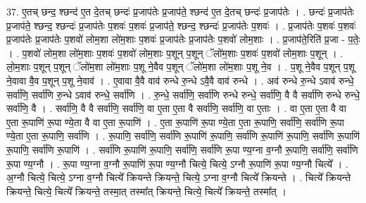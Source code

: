 \documentclass[17pt]{extarticle}
\begin{document}
37. ए॒तच् छन्द॒ श्छन्द॑ ए॒त दे॒तच् छन्दः॑ प्र॒जाप॑तेः प्र॒जाप॑ते॒ श्छन्द॑ ए॒त दे॒तच् छन्दः॑ प्र॒जाप॑तेः । . छन्दः॑ प्र॒जाप॑तेः प्र॒जाप॑ते॒ श्छन्द॒ श्छन्दः॑ प्र॒जाप॑तेः प॒शवः॑ प॒शवः॑ प्र॒जाप॑ते॒ श्छन्द॒ श्छन्दः॑ प्र॒जाप॑तेः प॒शवः॑ । . प्र॒जाप॑तेः प॒शवः॑ प॒शवः॑ प्र॒जाप॑तेः प्र॒जाप॑तेः प॒शवो॑ लोम॒शा लो॑म॒शाः प॒शवः॑ प्र॒जाप॑तेः प्र॒जाप॑तेः प॒शवो॑ लोम॒शाः । . प्र॒जाप॑ते॒रिति॑ प्र॒जा - प॒तेः॒ । . प॒शवो॑ लोम॒शा लो॑म॒शाः प॒शवः॑ प॒शवो॑ लोम॒शाः प॒शून् प॒शून् ॅलो॑म॒शाः प॒शवः॑ प॒शवो॑ लोम॒शाः प॒शून् । . लो॒म॒शाः प॒शून् प॒शून् ॅलो॑म॒शा लो॑म॒शाः प॒शू ने॒वैव प॒शून् ॅलो॑म॒शा लो॑म॒शाः प॒शू ने॒व । . प॒शू ने॒वैव प॒शून् प॒शू ने॒वावा वै॒व प॒शून् प॒शू ने॒वाव॑ । . ए॒वावा वै॒वै वाव॑ रुन्धे रु॒न्धे ऽवै॒वै वाव॑ रुन्धे । . अव॑ रुन्धे रु॒न्धे ऽवाव॑ रुन्धे॒ सर्वा॑णि॒ सर्वा॑णि रु॒न्धे ऽवाव॑ रुन्धे॒ सर्वा॑णि । . रु॒न्धे॒ सर्वा॑णि॒ सर्वा॑णि रुन्धे रुन्धे॒ सर्वा॑णि॒ वै वै सर्वा॑णि रुन्धे रुन्धे॒ सर्वा॑णि॒ वै । . सर्वा॑णि॒ वै वै सर्वा॑णि॒ सर्वा॑णि॒ वा ए॒ता ए॒ता वै सर्वा॑णि॒ सर्वा॑णि॒ वा ए॒ताः । . वा ए॒ता ए॒ता वै वा ए॒ता रू॒पाणि॑ रू॒पा ण्ये॒ता वै वा ए॒ता रू॒पाणि॑ । . ए॒ता रू॒पाणि॑ रू॒पा ण्ये॒ता ए॒ता रू॒पाणि॒ सर्वा॑णि॒ सर्वा॑णि रू॒पा ण्ये॒ता ए॒ता रू॒पाणि॒ सर्वा॑णि । . रू॒पाणि॒ सर्वा॑णि॒ सर्वा॑णि रू॒पाणि॑ रू॒पाणि॒ सर्वा॑णि रू॒पाणि॑ रू॒पाणि॒ सर्वा॑णि रू॒पाणि॑ रू॒पाणि॒ सर्वा॑णि रू॒पाणि॑ । . सर्वा॑णि रू॒पाणि॑ रू॒पाणि॒ सर्वा॑णि॒ सर्वा॑णि रू॒पा ण्य॒ग्ना व॒ग्नौ रू॒पाणि॒ सर्वा॑णि॒ सर्वा॑णि रू॒पा ण्य॒ग्नौ । . रू॒पा ण्य॒ग्ना व॒ग्नौ रू॒पाणि॑ रू॒पा ण्य॒ग्नौ चित्ये॒ चित्ये॒ ऽग्नौ रू॒पाणि॑ रू॒पा ण्य॒ग्नौ चित्ये᳚ । . अ॒ग्नौ चित्ये॒ चित्ये॒ ऽग्ना व॒ग्नौ चित्ये᳚ क्रियन्ते क्रियन्ते॒ चित्ये॒ ऽग्ना व॒ग्नौ चित्ये᳚ क्रियन्ते । . चित्ये᳚ क्रियन्ते क्रियन्ते॒ चित्ये॒ चित्ये᳚ क्रियन्ते॒ तस्मा॒त् तस्मा᳚त् क्रियन्ते॒ चित्ये॒ चित्ये᳚ क्रियन्ते॒ तस्मा᳚त् । \newline
\end{document}
